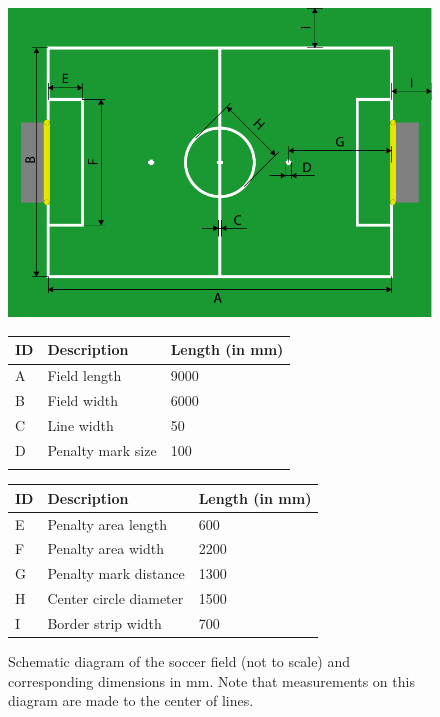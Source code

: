 \documentclass[12pt]{article}
\begin{document}
\begin{figure}[b!]
\centerline{\includegraphics[width=\columnwidth]{figs/fieldDimensions2013.pdf}}
\vspace{1ex}
\begin{tabular}{| l | l | l |}
ID & Description & Length (in mm) \\
\hline
A & Field length & 9000 \\
\hline
B & Field width & 6000 \\
\hline
C & Line width & 50 \\ 
\hline
D & Penalty mark size & 100 \\ 
\hline
 &  &  \\
\end{tabular}
\begin{tabular}{|l|l|l|}
ID & Description & Length (in mm) \\
\hline
E & Penalty area length & 600 \\
\hline
F & Penalty area width & 2200 \\
\hline
G & Penalty mark distance & 1300 \\ 
\hline
H & Center circle diameter & 1500 \\
\hline
I & Border strip width & 700 \\
\end{tabular}
\caption{Schematic diagram of the soccer field (not to scale) and corresponding dimensions in mm.  Note that measurements on this diagram are made to the center of lines.} \label{fig:field_dim}
\end{figure}
\end{document}
